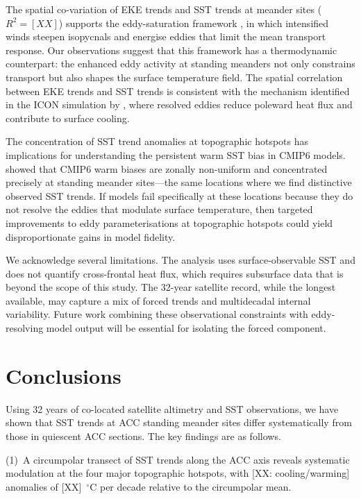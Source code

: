 \documentclass[draft]{agujournal2019}
\begin{document}
The spatial co-variation of EKE trends and SST trends at meander sites ($R^{2} = [XX]$) supports the eddy-saturation framework \cite{munday2013eddy, constantinou2019eddy, stewart2023eddy}, in which intensified winds steepen isopycnals and energise eddies that limit the mean transport response.
Our observations suggest that this framework has a thermodynamic counterpart: the enhanced eddy activity at standing meanders not only constrains transport but also shapes the surface temperature field.
The spatial correlation between EKE trends and SST trends is consistent with the mechanism identified in the ICON simulation by , where resolved eddies reduce poleward heat flux and contribute to surface cooling.


The concentration of SST trend anomalies at topographic hotspots has implications for understanding the persistent warm SST bias in CMIP6 models.
 showed that CMIP6 warm biases are zonally non-uniform and concentrated precisely at standing meander sites---the same locations where we find distinctive observed SST trends.
If models fail specifically at these locations because they do not resolve the eddies that modulate surface temperature, then targeted improvements to eddy parameterisations at topographic hotspots could yield disproportionate gains in model fidelity.


We acknowledge several limitations.
The analysis uses surface-observable SST and does not quantify cross-frontal heat flux, which requires subsurface data that is beyond the scope of this study.
The 32-year satellite record, while the longest available, may capture a mix of forced trends and multidecadal internal variability.
Future work combining these observational constraints with eddy-resolving model output will be essential for isolating the forced component.


\section{Conclusions}

Using 32 years of co-located satellite altimetry and SST observations, we have shown that SST trends at ACC standing meander sites differ systematically from those in quiescent ACC sections.
The key findings are as follows.

(1)~A circumpolar transect of SST trends along the ACC axis reveals systematic modulation at the four major topographic hotspots, with [XX: cooling/warming] anomalies of [XX]~$^{\circ}$C per decade relative to the circumpolar mean.
\end{document}
